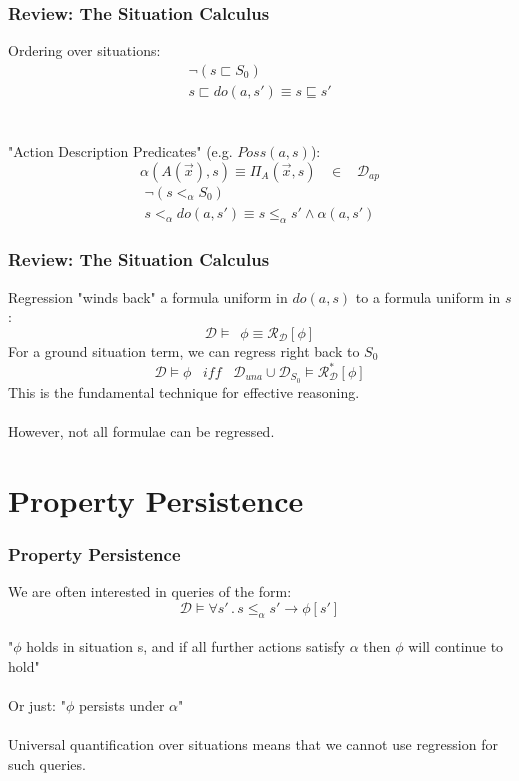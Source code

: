 \documentclass[compress]{beamer}
\begin{document}
\begin{frame}
\frametitle{Review: The Situation Calculus}
Ordering over situations:
\begin{gather*}
\neg\left(s \sqsubset S_0\right)\\
s\sqsubset do(a,s')\equiv s\sqsubseteq s'
\end{gather*}
\ \\
\ \\
"Action Description Predicates" (e.g. $Poss(a,s)$):
\begin{equation*}
\alpha(A(\overrightarrow{x}),s) \equiv \Pi_A(\overrightarrow{x},s)\,\,\,\,\,\in\,\,\,\,\,\mathcal{D}_{ap}
\end{equation*}
\begin{gather*}
\neg\left(s <_{\alpha} S_0\right)\\
s <_{\alpha} do(a,s')\equiv s \leq_{\alpha} s' \wedge \alpha(a,s')
\end{gather*}

\end{frame}

\begin{frame}
\frametitle{Review: The Situation Calculus}
Regression "winds back" a formula uniform in $do(a,s)$ to a formula uniform in $s$:
\begin{equation*}
\mathcal{D} \models\,\,\, \phi \equiv \mathcal{R}_{\mathcal{D}}[\phi]
\end{equation*}
For a ground situation term, we can regress right back to $S_0$
\begin{equation*}
\mathcal{D} \models \phi\,\,\,\,\,\mathit{iff}\,\,\,\,\,\mathcal{D}_{una}\cup\mathcal{D}_{S_0} \models \mathcal{R}^*_{\mathcal{D}}[\phi]
\end{equation*}
This is the fundamental technique for effective reasoning.
\ \\
\ \\
However, not all formulae can be regressed.
\end{frame}


\section{Property Persistence}

\begin{frame}
\frametitle{Property Persistence}
We are often interested in queries of the form:
\begin{equation*}
\mathcal{D} \models \forall s'\,.\,s \leq_{\alpha} s' \rightarrow \phi[s']
\end{equation*}
\ \\
"$\phi$ holds in situation s, and if all further actions satisfy $\alpha$ then $\phi$ will continue to hold"
\ \\
\ \\
Or just: "$\phi$ persists under $\alpha$"
\ \\
\ \\
Universal quantification over situations means that we cannot use regression
for such queries.
\end{frame}
\end{document}
